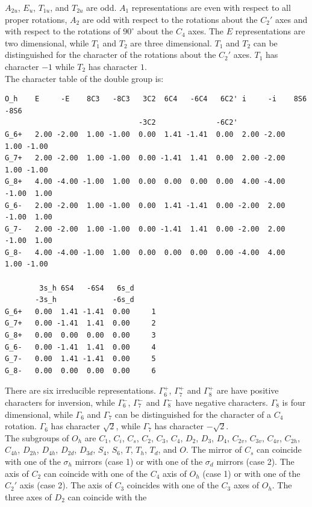 \documentclass[12pt,a4paper]{article}
\begin{document}
$A_{2u}$, $E_u$, $T_{1u}$, and $T_{2u}$ are odd. $A_1$ representations are even
with respect to all proper rotations, $A_2$ are odd with respect to
the rotations about the $C_2'$ axes and with respect to the rotations
of $90^\circ$ about the $C_4$ axes. The $E$ representations are two
dimensional, while $T_1$ and $T_2$ are three dimensional. $T_1$ and $T_2$
can be distinguished for the character of the rotations about the $C_2'$
axes. $T_1$ has character $-1$ while $T_2$ has character $1$. \\
The character table of the double group is:
\begin{verbatim}
O_h    E     -E    8C3   -8C3   3C2  6C4   -6C4   6C2' i     -i    8S6   -8S6 
                               -3C2              -6C2'                        
G_6+   2.00 -2.00  1.00 -1.00  0.00  1.41 -1.41  0.00  2.00 -2.00  1.00 -1.00
G_7+   2.00 -2.00  1.00 -1.00  0.00 -1.41  1.41  0.00  2.00 -2.00  1.00 -1.00
G_8+   4.00 -4.00 -1.00  1.00  0.00  0.00  0.00  0.00  4.00 -4.00 -1.00  1.00
G_6-   2.00 -2.00  1.00 -1.00  0.00  1.41 -1.41  0.00 -2.00  2.00 -1.00  1.00
G_7-   2.00 -2.00  1.00 -1.00  0.00 -1.41  1.41  0.00 -2.00  2.00 -1.00  1.00
G_8-   4.00 -4.00 -1.00  1.00  0.00  0.00  0.00  0.00 -4.00  4.00  1.00 -1.00

        3s_h 6S4   -6S4   6s_d
       -3s_h             -6s_d
G_6+   0.00  1.41 -1.41  0.00     1
G_7+   0.00 -1.41  1.41  0.00     2
G_8+   0.00  0.00  0.00  0.00     3
G_6-   0.00 -1.41  1.41  0.00     4
G_7-   0.00  1.41 -1.41  0.00     5
G_8-   0.00  0.00  0.00  0.00     6
\end{verbatim}
There are six irreducible representations. $\Gamma_6^+$, $\Gamma_7^+$ and
$\Gamma_8^+$ are have positive characters for inversion, while
$\Gamma_6^-$, $\Gamma_7^-$ and $\Gamma_8^-$ have negative characters.
$\Gamma_8$ is four dimensional, while $\Gamma_6$ and $\Gamma_7$ can be
distinguished for the character of a $C_4$ rotation. $\Gamma_6$ has 
character $\sqrt{2}$, while $\Gamma_7$ has character $-\sqrt{2}.$ \\
The subgroups of $O_h$ are $C_1$, $C_i$, $C_s$, $C_2$, $C_3$, $C_4$,
$D_2$, $D_3$, $D_4$, $C_{2v}$, $C_{3v}$, $C_{4v}$, $C_{2h}$, $C_{4h}$, 
$D_{2h}$, $D_{4h}$, $D_{2d}$, $D_{3d}$, $S_4$, $S_6$, $T$, $T_h$, 
$T_d$, and $O$. The mirror of $C_s$ can coincide with one of the $\sigma_h$ 
mirrors (case 1) or with one of the $\sigma_d$ mirrors (case 2). The axis
of $C_2$ can coincide with one of the $C_4$ axis of $O_h$ (case 1) or
with one of the $C_2'$ axis (case 2). The axis of $C_3$ coincides with one
of the $C_3$ axes of $O_h$. The three axes of $D_2$ can coincide with the
\end{document}
